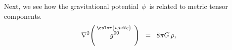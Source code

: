 
\vskip 0.3cm
\noindent
Next, we see how the gravitational potential \,$\phi$\, is related to metric tensor components.
\begin{equation*}
\nabla^{2}\!\left(\,\overset{{\color{white}.}}{g^{00}}\,\right) \;\; = \;\; 8 \pi G \, \rho,
\end{equation*}




